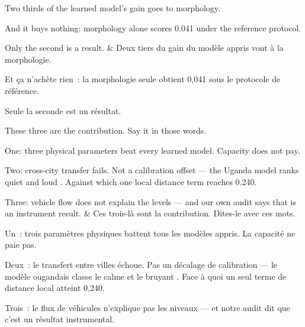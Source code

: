 \documentclass[10pt,a4paper]{article}
\begin{document}
\begin{say}
Two thirds of the learned model's gain goes to morphology.

And it buys nothing: morphology alone scores 0.041 under the reference protocol.

 Only the second is a result.
&
Deux tiers du gain du modèle appris vont à la morphologie.

Et ça n'achète rien~: la morphologie seule obtient 0,041 sous le protocole de
référence.

 Seule la seconde est un résultat.
\end{say}

\begin{say}
These three are the contribution. Say it in those words.

One: three physical parameters beat every learned model. Capacity does not pay.

Two: cross-city transfer fails. Not a calibration offset --- the Uganda model
ranks quiet and loud . Against which one local distance
term reaches 0.240.

Three: vehicle flow does not explain the levels --- and our own audit says that is
an instrument result.
&
Ces trois-là sont la contribution. Dites-le avec ces mots.

Un~: trois paramètres physiques battent tous les modèles appris. La capacité ne
paie pas.

Deux~: le transfert entre villes échoue. Pas un décalage de calibration --- le
modèle ougandais classe le calme et le bruyant . Face à quoi un
seul terme de distance local atteint 0,240.

Trois~: le flux de véhicules n'explique pas les niveaux --- et notre audit dit que
c'est un résultat instrumental.
\end{say}
\end{document}

